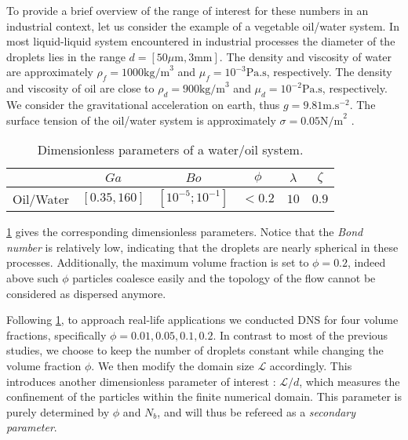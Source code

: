 To provide a brief overview of the range of interest for these numbers in an industrial context, let us consider the example of a vegetable oil/water system.
In most liquid-liquid system encountered in industrial processes the diameter of the droplets lies in the range $d = [50 \mu \text{m}, 3 \text{mm}]$.
The density and viscosity of water are approximately $\rho_f = 1000 \text{kg/m}^3$ and $\mu_f = 10^{-3} \text{Pa.s}$, respectively.
The density and viscosity of oil are close to $\rho_d = 900 \text{kg/m}^3$ and $\mu_d = 10^{-2} \text{Pa.s}$, respectively.
We consider the gravitational acceleration on earth, thus $g= 9.81 \text{m.s}^{-2}$.
The surface tension of the oil/water system is approximately $\sigma = 0.05 \text{N/m}^2$ \citep{de2015gouttes}. 
\begin{table}[h!]
    \centering
    \caption{Dimensionless parameters of a water/oil system.}
    \begin{tabular}{|c||c|c|c|c|c|}
        \hline&$Ga$&$Bo$&$\phi$&$\lambda$&$\zeta$\\ \hline
        \hline Oil/Water&$[0.35,160]$&$[10^{-5};10^{-1}]$&$<0.2$&$10$&$0.9$\\ \hline
    \end{tabular}
    \label{tab:parameters_exp}
\end{table}
\ref{tab:parameters_exp} gives the corresponding dimensionless parameters.  
Notice that the \textit{Bond number} is relatively low, indicating that the droplets are nearly spherical in these processes.
Additionally, the maximum volume fraction is set to $\phi = 0.2$, indeed above such $\phi$ particles coalesce easily and the topology of the flow cannot be considered as dispersed anymore. 


Following \ref{tab:parameters_exp}, to approach real-life applications we conducted DNS for four volume fractions, specifically $\phi = 0.01,0.05,0.1,0.2$.
In contrast to most of the previous studies, we choose to keep the number of droplets constant while changing the volume fraction $\phi$. 
We then modify the domain size $\mathcal{L}$ accordingly. 
This introduces another dimensionless parameter of interest : $\mathcal{L}/d$, which measures the confinement of the particles within the finite numerical domain. 
This parameter is purely determined by $\phi$ and $N_b$, and will thus be refereed as a \textit{secondary parameter}.

